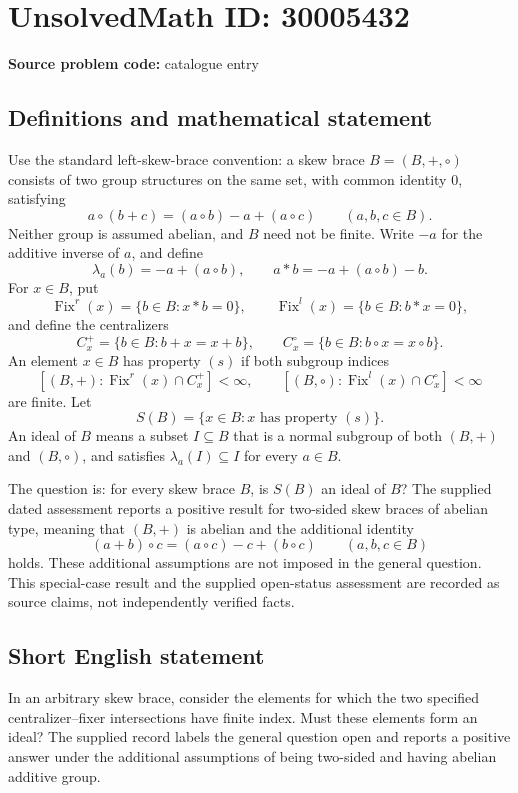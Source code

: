 \documentclass[11pt]{article}
\begin{document}
\section*{UnsolvedMath ID: 30005432}
\textbf{Source problem code:} catalogue entry
\subsection{Definitions and mathematical statement}
Use the standard left-skew-brace convention: a skew brace \(B=(B,+,\circ)\) consists of two group structures on the same set, with common identity \(0\), satisfying
\[
 a\circ(b+c)=(a\circ b)-a+(a\circ c)
 \qquad(a,b,c\in B).
\]
Neither group is assumed abelian, and \(B\) need not be finite. Write \(-a\) for the additive inverse of \(a\), and define
\[
 \lambda_a(b)=-a+(a\circ b),\qquad
 a*b=-a+(a\circ b)-b.
\]
For \(x\in B\), put
\[
 \operatorname{Fix}^{r}(x)=\{b\in B:x*b=0\},\qquad
 \operatorname{Fix}^{l}(x)=\{b\in B:b*x=0\},
\]
and define the centralizers
\[
 C_x^+=\{b\in B:b+x=x+b\},\qquad
 C_x^\circ=\{b\in B:b\circ x=x\circ b\}.
\]
An element \(x\in B\) has property \((s)\) if both subgroup indices
\[
 [(B,+):\operatorname{Fix}^{r}(x)\cap C_x^+]<\infty,
 \qquad
 [(B,\circ):\operatorname{Fix}^{l}(x)\cap C_x^\circ]<\infty
\]
are finite. Let
\[
 S(B)=\{x\in B:x\text{ has property }(s)\}.
\]
An ideal of \(B\) means a subset \(I\subseteq B\) that is a normal subgroup of both \((B,+)\) and \((B,\circ)\), and satisfies \(\lambda_a(I)\subseteq I\) for every \(a\in B\).

The question is: for every skew brace \(B\), is \(S(B)\) an ideal of \(B\)? The supplied dated assessment reports a positive result for two-sided skew braces of abelian type, meaning that \((B,+)\) is abelian and the additional identity
\[
 (a+b)\circ c=(a\circ c)-c+(b\circ c)
 \qquad(a,b,c\in B)
\]
holds. These additional assumptions are not imposed in the general question. This special-case result and the supplied open-status assessment are recorded as source claims, not independently verified facts.
\subsection{Short English statement}
In an arbitrary skew brace, consider the elements for which the two specified centralizer--fixer intersections have finite index. Must these elements form an ideal? The supplied record labels the general question open and reports a positive answer under the additional assumptions of being two-sided and having abelian additive group.
\end{document}
